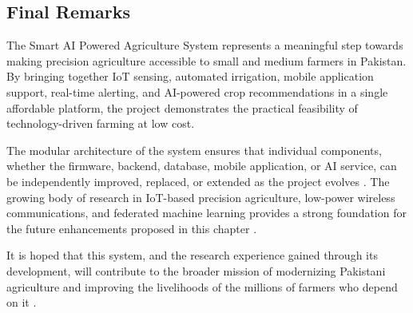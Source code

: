 \subsection{Final Remarks}

The Smart AI Powered Agriculture System represents a meaningful 
step towards making precision agriculture accessible to small 
and medium farmers in Pakistan. By bringing together IoT 
sensing, automated irrigation, mobile application support, 
real-time alerting, and AI-powered crop recommendations in a 
single affordable platform, the project demonstrates the 
practical feasibility of technology-driven farming at low cost.

The modular architecture of the system ensures that individual 
components, whether the firmware, backend, database, mobile 
application, or AI service, can be independently improved, 
replaced, or extended as the project evolves 
\cite{sommerville2016software}. The growing body of research 
in IoT-based precision agriculture, low-power wireless 
communications, and federated machine learning provides a 
strong foundation for the future enhancements proposed in 
this chapter \cite{farooq2019survey}.

It is hoped that this system, and the research experience 
gained through its development, will contribute to the 
broader mission of modernizing Pakistani agriculture and 
improving the livelihoods of the millions of farmers who 
depend on it \cite{shafi2019precision}.

\setcounter{chapter}{7}